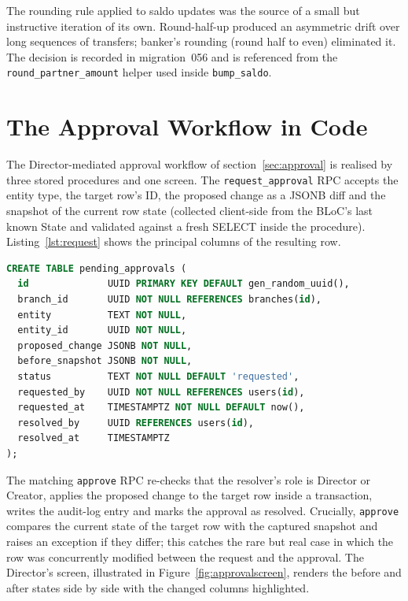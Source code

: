 The rounding rule applied to saldo updates was the source of a small but instructive iteration of its own. Round-half-up produced an asymmetric drift over long sequences of transfers; banker's rounding (round half to even) eliminated it. The decision is recorded in migration~056 and is referenced from the \texttt{round\_partner\_amount} helper used inside \texttt{bump\_saldo}.

\section{The Approval Workflow in Code}
\label{sec:approvalimpl}

The Director-mediated approval workflow of section~\ref{sec:approval} is realised by three stored procedures and one screen. The \texttt{request\_approval} RPC accepts the entity type, the target row's ID, the proposed change as a JSONB diff and the snapshot of the current row state (collected client-side from the BLoC's last known State and validated against a fresh SELECT inside the procedure). Listing~\ref{lst:request} shows the principal columns of the resulting row.

\begin{lstlisting}[language=SQL,caption={Pending approval: principal columns},label={lst:request}]
CREATE TABLE pending_approvals (
  id              UUID PRIMARY KEY DEFAULT gen_random_uuid(),
  branch_id       UUID NOT NULL REFERENCES branches(id),
  entity          TEXT NOT NULL,
  entity_id       UUID NOT NULL,
  proposed_change JSONB NOT NULL,
  before_snapshot JSONB NOT NULL,
  status          TEXT NOT NULL DEFAULT 'requested',
  requested_by    UUID NOT NULL REFERENCES users(id),
  requested_at    TIMESTAMPTZ NOT NULL DEFAULT now(),
  resolved_by     UUID REFERENCES users(id),
  resolved_at     TIMESTAMPTZ
);
\end{lstlisting}

The matching \texttt{approve} RPC re-checks that the resolver's role is Director or Creator, applies the proposed change to the target row inside a transaction, writes the audit-log entry and marks the approval as resolved. Crucially, \texttt{approve} compares the current state of the target row with the captured snapshot and raises an exception if they differ; this catches the rare but real case in which the row was concurrently modified between the request and the approval. The Director's screen, illustrated in Figure~\ref{fig:approvalscreen}, renders the before and after states side by side with the changed columns highlighted.

